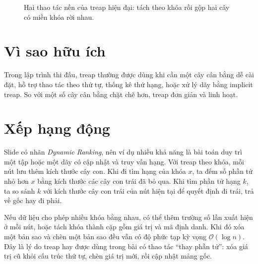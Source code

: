 \documentclass[11pt]{article}
\newcommand{\Oh}{\mathcal{O}}
\begin{document}
\begin{figure}[ht]
\centering
{}
\caption{Hai thao tác nền của treap hiện đại: tách theo khóa rồi gộp hai cây có miền khóa rời nhau.}
\end{figure}

\section{Vì sao hữu ích}

Trong lập trình thi đấu, treap thường được dùng khi cần một cây cân bằng dễ
cài đặt, hỗ trợ thao tác theo thứ tự, thống kê thứ hạng, hoặc xử lý dãy bằng
implicit treap. So với một số cây cân bằng chặt chẽ hơn, treap đơn giản và
linh hoạt.

\section{Xếp hạng động}

Slide có nhãn \textit{Dynamic Ranking}, nên ví dụ nhiều khả năng là bài toán
duy trì một tập hoặc một dãy có cập nhật và truy vấn hạng. Với treap theo
khóa, mỗi nút lưu thêm kích thước cây con. Khi đi tìm hạng của khóa \(x\), ta
đếm số phần tử nhỏ hơn \(x\) bằng kích thước các cây con trái đã bỏ qua. Khi
tìm phần tử hạng \(k\), ta so sánh \(k\) với kích thước cây con trái của nút
hiện tại để quyết định đi trái, trả về gốc hay đi phải.

Nếu dữ liệu cho phép nhiều khóa bằng nhau, có thể thêm trường số lần xuất hiện
ở mỗi nút, hoặc tách khóa thành cặp gồm giá trị và mã định danh. Khi đó xóa
một bản sao và chèn một bản sao đều vẫn có độ phức tạp kỳ vọng
\(\Oh(\log n)\). Đây là lý do treap hay được dùng trong bài có thao tác
``thay phần tử'': xóa giá trị cũ khỏi cấu trúc thứ tự, chèn giá trị mới, rồi
cập nhật mảng gốc.
\end{document}
